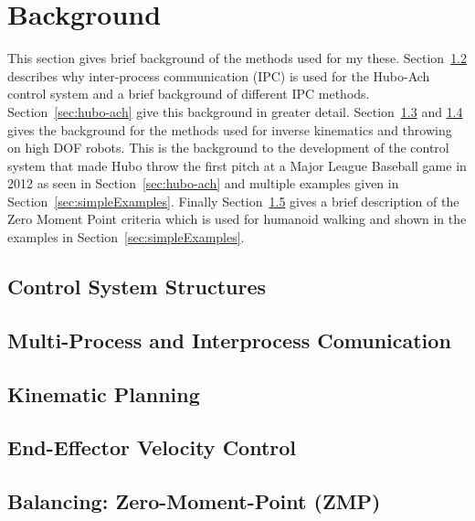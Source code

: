 \chapter{Background}\label{sec:background}

This section gives brief background of the methods used for my these.
Section~\ref{sec:back:hubo-ach} describes why inter-process communication (IPC) is used for the Hubo-Ach control system and a brief background of different IPC methods.
Section~\ref{sec:hubo-ach} give this background in greater detail.
Section~\ref{sec:back:ik} and \ref{sec:back:eefvelos} gives the background for the methods used for inverse kinematics and throwing on high DOF robots.
This is the background to the development of the control system that made Hubo throw the first pitch at a Major League Baseball game in 2012 as seen in Section~\ref{sec:hubo-ach} and multiple examples given in Section~\ref{sec:simpleExamples}.
Finally Section~\ref{sec:zmp} gives a brief description of the Zero Moment Point criteria which is used for humanoid walking and shown in the examples in Section~\ref{sec:simpleExamples}.

		\section{Control System Structures}\label{sec:back:struct}
			
		
		\section{Multi-Process and Interprocess Comunication}\label{sec:back:hubo-ach}
	    		
		\section{Kinematic Planning}\label{sec:back:ik}
			
		\section{End-Effector Velocity Control}\label{sec:back:eefvelos}
			
%			
		\section{Balancing: Zero-Moment-Point (ZMP)}\label{sec:zmp}
			
